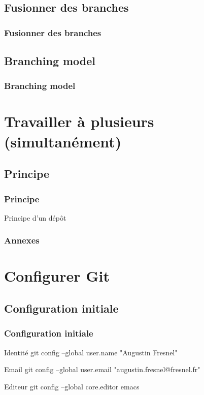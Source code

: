 \documentclass[t,11pt]{beamer}
\begin{document}
\subsection{Fusionner des branches}

\begin{frame}
        \frametitle{Fusionner des branches}
\end{frame}

\subsection{Branching model}
\begin{frame}
        \frametitle{Branching model}
\end{frame}

\section{Travailler \`a plusieurs (simultan\'ement) }

\subsection{Principe}
\begin{frame}
        \frametitle{Principe}
        Principe d'un d\'ep\^ot
\end{frame}

\appendix
\begin{frame}[c]
        \frametitle{Annexes}
        \tableofcontents[hideallsubsections]
\end{frame}

\section{Configurer Git}
\subsection{Configuration initiale}
\begin{frame}
        \frametitle{Configuration initiale}
        \begin{block}{Identit\'e}
                git config --global user.name "Augustin Fresnel"
        \end{block}
        
        \begin{block}{Email}
                git config --global user.email "augustin.fresnel@fresnel.fr"
        \end{block}

        \begin{block}{Editeur}
                git config --global core.editor emacs
        \end{block}
\end{frame}
\end{document}
